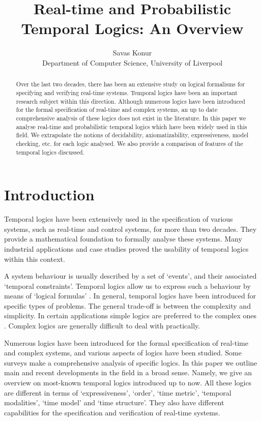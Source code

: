 \documentclass[11pt]{article}
\begin{document}
\title{Real-time and Probabilistic Temporal Logics: An Overview}

\author{Savas Konur\\Department of Computer Science, University of Liverpool}

\date{}

\maketitle

\begin{abstract}
Over the last two decades, there has been an extensive study on logical formalisms for specifying and verifying real-time systems. Temporal logics have been an important research subject within this direction. Although numerous logics have been introduced for the formal specification of real-time and complex systems, an up to date comprehensive analysis of these logics does not exist in the literature. In this paper we analyse real-time and probabilistic temporal logics which have been widely used in this field. We extrapolate the notions of decidability, axiomatizability, expressiveness, model checking, etc. for each logic analysed. We also provide a comparison of features of the temporal logics discussed.
\end{abstract}

\section{Introduction}

Temporal logics have been extensively used in the specification of various systems, such as real-time and control systems, for more than two decades. They provide a mathematical foundation to formally analyse these systems. Many industrial applications and case studies proved the usability of temporal logics within this context. 

A system behaviour is usually described by a set of `events', and their associated `temporal constraints'.  Temporal logics allow us to express such a behaviour by means of `logical formulas' \cite{BMN00}. In general, temporal logics have been introduced for specific types of problems. The general trade-off is between the complexity and simplicity. In certain applications simple logics are preferred to the complex ones \cite{BMN00}. Complex logics are generally difficult to deal with practically. 

Numerous logics have been introduced for the formal specification of real-time and complex systems, and various aspects of logics have been studied. Some surveys \cite{Ost92,AHT92,BMN00,GMS04} make a comprehensive analysis of specific logics. In this paper we outline main and recent developments in the field in a broad sense. Namely, we give an overview on most-known temporal logics introduced up to now. All these logics are different in terms of `expressiveness', `order', `time metric', `temporal modalities', `time model' and `time structure'. They also have different capabilities for the specification and verification of real-time systems.
\end{document}
